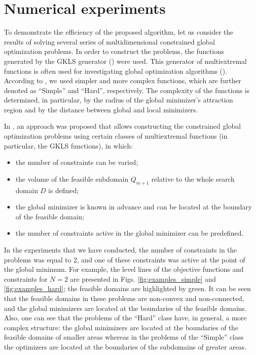 \documentclass[twocolumn]{svjour3}          %
\begin{document}
\section{Numerical experiments}
\label{sec:5}
To demonstrate the efficiency of the proposed algorithm, let us consider the results of solving several series of multidimensional constrained global optimization problems. In order to construct the problems, the functions generated by the GKLS generator (\cite{Gaviano2003}) were used. This generator of multiextremal functions is often used for investigating global optimization algorithms (\cite{Sergeyev2015,Paulavicius2014,Barkalov2018}). According to \cite{Gaviano2003}, we used simpler and more complex functions, which are  further denoted as ``Simple'' and ``Hard'', respectively. The complexity of the functions is determined, in particular, by the radius of the global minimizer's attraction region and by the distance between global and local minimizers.
	
	In \cite{Gergel2017_2,Gergel2019}, an approach was proposed that allows constructing the constrained global optimization problems using certain classes of multiextremal functions (in particular, the GKLS functions), in which:
\begin{itemize}
  \item the number of constraints can be varied;
  \item the volume of the feasible subdomain $Q_{m+1}$ relative to the whole search domain $D$ is defined;
	\item the global minimizer is known in advance and can be located at the boundary of the feasible domain;
	\item the number of constraints active in the global minimizer can be predefined.
\end{itemize}	

	In the experiments that we have conducted, the number of constraints in the problems was equal to 2, and one of these constraints was active at the point of the global minimum. For example, the level lines of the objective functions and constraints for $N=2$ are presented in Figs. \ref{fig:examples_simple} and \ref{fig:examples_hard}; the feasible domains are highlighted by green. It can be seen that the feasible domains in these problems are non-convex and non-connected, and the global minimizers are located at the boundaries of the feasible domains. Also, one can see that the problems of the ``Hard'' class have, in general, a more complex structure: the global minimizers are located at the boundaries of the feasible domains of smaller areas whereas in the problems of the ``Simple'' class the optimizers are located at the boundaries of the subdomains of greater areas.
	
\end{document}
